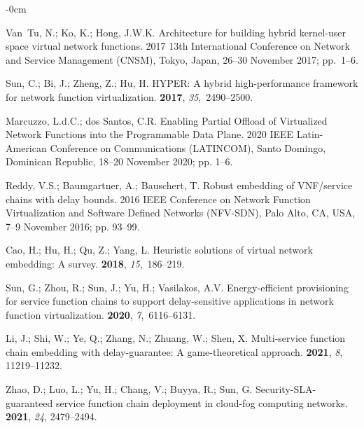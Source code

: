 \documentclass[futureinternet,review,accept,pdftex,moreauthors]{Definitions/mdpi}
\begin{document}
\begin{adjustwidth}{-\extralength}{0cm}
\begin{thebibliography}{999}
Van~Tu, N.; Ko, K.; Hong, J.W.K.
\newblock Architecture for building hybrid kernel-user space virtual network
  functions.
 2017 13th International Conference on Network and Service Management
  (CNSM),  Tokyo, Japan, 26--30 November 2017; \mbox{pp. 1--6.}

Sun, C.; Bi, J.; Zheng, Z.; Hu, H.
\newblock HYPER: A hybrid high-performance framework for network function
  virtualization.
 {\bf 2017},
  {\em 35},~2490--2500.

Marcuzzo, L.d.C.; dos Santos, C.R.
\newblock Enabling Partial Offload of Virtualized Network Functions into the
  Programmable Data Plane.
 2020 IEEE Latin-American Conference on Communications (LATINCOM),   Santo Domingo, Dominican Republic, 18--20 November 2020; pp. 1--6.

Reddy, V.S.; Baumgartner, A.; Bauschert, T.
\newblock Robust embedding of VNF/service chains with delay bounds.
 2016 IEEE Conference on Network Function Virtualization and Software
  Defined Networks (NFV-SDN),  Palo Alto, CA, USA, 7--9 November 2016; pp. 93--99.

Cao, H.; Hu, H.; Qu, Z.; Yang, L.
\newblock Heuristic solutions of virtual network embedding: A survey.
 {\bf 2018}, {\em 15},~186--219.

Sun, G.; Zhou, R.; Sun, J.; Yu, H.; Vasilakos, A.V.
\newblock Energy-efficient provisioning for service function chains to support
  delay-sensitive applications in network function virtualization.
 {\bf 2020}, {\em
  7},~6116--6131.

Li, J.; Shi, W.; Ye, Q.; Zhang, N.; Zhuang, W.; Shen, X.
\newblock Multi-service function chain embedding with delay-guarantee: A
  game-theoretical approach.
 {\bf 2021}, \emph{8}, 11219--11232.

Zhao, D.; Luo, L.; Yu, H.; Chang, V.; Buyya, R.; Sun, G.
\newblock Security-SLA-guaranteed service function chain deployment in
  cloud-fog computing networks.
 {\bf 2021}, \emph{24}, 2479--2494.


\end{thebibliography}
\end{adjustwidth}
\end{document}

